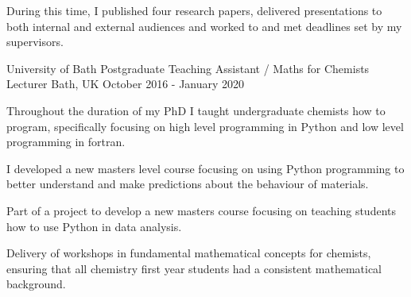 \begin{cventries}
{\begin{cvitems}
        \item {During this time, I published four research papers, delivered presentations to both internal and external audiences and worked to and met deadlines set by my supervisors.}
      \end{cvitems}
    }
    \cventry
    {University of Bath}    
    {Postgraduate Teaching Assistant / Maths for Chemists Lecturer}
    {Bath, UK}
    {October 2016 - January 2020}
    {
      \begin{cvitems}
        \item{Throughout the duration of my PhD I taught undergraduate chemists how to program, specifically focusing on high level programming in Python and low level programming in fortran.}
        \item{I developed a new masters level course focusing on using Python programming to better understand and make predictions about the behaviour of materials.}
        \item{Part of a project to develop a new masters course focusing on teaching students how to use Python in data analysis.}
        \item
        {Delivery of workshops in fundamental mathematical concepts for chemists, ensuring that all chemistry first year students had a consistent mathematical background.} 
      \end{cvitems}
    }
\end{cventries}
